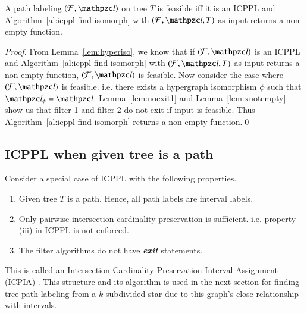 \documentclass[synopsis,MS]             %
              {iitmdiss}
\begin{document}
\begin{theorem}
  \label{th:charac}
  A path labeling $(\cF, \cl)$ on tree $T$ is feasible iff it is an
  ICPPL and Algorithm~\ref{al:icppl-find-isomorph} with $(\cF, \cl,
  T)$ as input returns a non-empty function.
\end{theorem}
\begin{proof}
  From Lemma~\ref{lem:hyperiso}, we know that if $(\cF, \cl)$ is an
  ICPPL and Algorithm~\ref{al:icppl-find-isomorph} with $(\cF, \cl,
  T)$ as input returns a non-empty function, $(\cF, \cl)$ is feasible.
  Now consider the case where $(\cF, \cl)$ is feasible. i.e. there
  exists a hypergraph isomorphism $\phi$ such that $\cl_\phi =
  \cl$. Lemma~\ref{lem:noexit1} and Lemma~\ref{lem:xnotempty} show us
  that filter 1 and filter 2 do not exit if input is feasible. Thus
  Algorithm~\ref{al:icppl-find-isomorph} returns a non-empty function.\qed
\end{proof}


\subsection{ICPPL when given tree is a path}
\label{subsec:icpplicpia}
\xnoindent
Consider a special case of ICPPL with the following properties.
\begin{enumerate}
\item Given tree $T$ is a path. Hence, all path labels are interval labels.
\item Only pairwise intersection cardinality
  preservation is sufficient. i.e. property (iii) in ICPPL is not enforced.
\item The filter algorithms do not have {\em \bf exit} statements.
\end{enumerate}
This is called an Intersection Cardinality Preservation Interval
Assignment (ICPIA) \cite{nsnrs09}. This structure and its algorithm is
used in the next section for finding tree path labeling from a
$k$-subdivided star due to this graph's close relationship with
intervals. 
\end{document}
